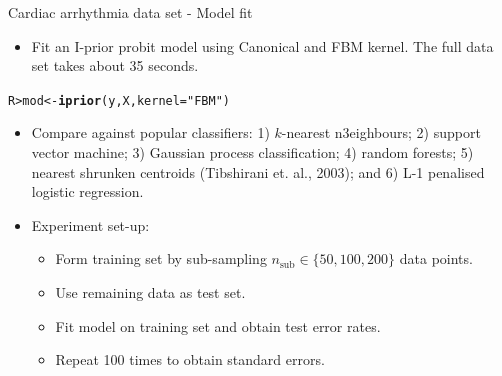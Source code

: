 \documentclass{beamer}\usepackage[]{graphicx}\usepackage[]{color}
\makeatletter
\newcommand{\hlstr}[1]{\textcolor[rgb]{0.192,0.494,0.8}{#1}}%
\newcommand{\hlstd}[1]{\textcolor[rgb]{0.345,0.345,0.345}{#1}}%
\newcommand{\hlkwb}[1]{\textcolor[rgb]{0.69,0.353,0.396}{#1}}%
\newcommand{\hlkwc}[1]{\textcolor[rgb]{0.333,0.667,0.333}{#1}}%
\newcommand{\hlkwd}[1]{\textcolor[rgb]{0.737,0.353,0.396}{\textbf{#1}}}%
\newenvironment{kframe}{%
 \def\at@end@of@kframe{}%
 \ifinner\ifhmode%
  \def\at@end@of@kframe{\end{minipage}}%
  \begin{minipage}{\columnwidth}%
 \fi\fi%
 \def\FrameCommand##1{\hskip\@totalleftmargin \hskip-\fboxsep
 \colorbox{shadecolor}{##1}\hskip-\fboxsep
     \hskip-\linewidth \hskip-\@totalleftmargin \hskip\columnwidth}%
 \MakeFramed {\advance\hsize-\width
   \@totalleftmargin\z@ \linewidth\hsize
   \@setminipage}}%
 {\par\unskip\endMakeFramed%
 \at@end@of@kframe}
\newenvironment{knitrout}{}{} %
\makeatother
\begin{document}
\begin{frame}[fragile]{Cardiac arrhythmia data set - Model fit}
\vspace{-20pt}
\begin{itemize}
  \item Fit an I-prior probit model using Canonical and FBM kernel. The full data set takes about 35 seconds.
\end{itemize}
\vspace{-5pt}
\begin{knitrout}\small
{}\color{fgcolor}\begin{kframe}
\begin{alltt}
\hlstd{R> }\hlstd{mod} \hlkwb{<-} \hlkwd{iprior}\hlstd{(y, X,} \hlkwc{kernel} \hlstd{=} \hlstr{"FBM"}\hlstd{)}
\end{alltt}
\end{kframe}
\end{knitrout}
\vspace{-10pt}
\begin{itemize}
  \item Compare against popular classifiers: 1) $k$-nearest n3eighbours; 2) support vector machine; 3) Gaussian process classification; 4) random forests; 5) nearest shrunken centroids (Tibshirani et. al., 2003); and 6) L-1 penalised logistic regression. %
  \vspace{0.5em}
  \item Experiment set-up:
  \begin{itemize}
    \item Form training set by sub-sampling $n_{\text{sub}} \in \{50, 100, 200 \}$ data points.
    \item Use remaining data as test set.
    \item Fit model on training set and obtain test error rates.
    \item Repeat 100 times to obtain standard errors.
  \end{itemize}
\end{itemize}

\end{frame}
\end{document}
